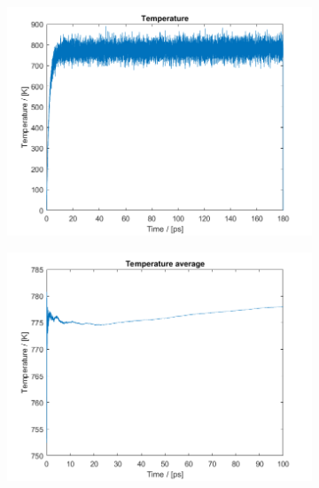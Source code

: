 \begin{figure}[H]
\begin{subfigure}[b]{0.40\textwidth}
    \end{subfigure}
    \begin{subfigure}[b]{0.40\textwidth}
        \centering
        \includegraphics[width=\textwidth]{graphics/task3/temperature.png}
    \end{subfigure}
    \begin{subfigure}[b]{0.40\textwidth}
        \centering
        \includegraphics[width=\textwidth]{graphics/task3/temperature_avg.png}
    \end{subfigure}
    \begin{subfigure}[b]{0.40\textwidth}
        \centering

\end{subfigure}
\end{figure}

